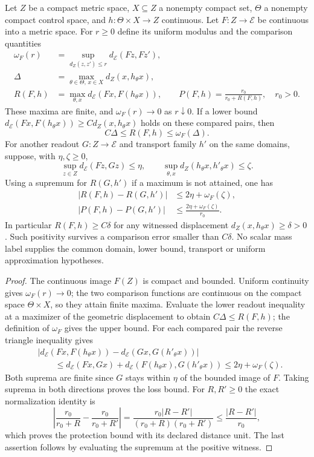 \begin{theorem}\label{thm:readout-loss-stability}
Let $Z$ be a compact metric space, $X\subseteq Z$ a nonempty compact set,
$\Theta$ a nonempty compact control space, and $h:\Theta\times X\to Z$
continuous. Let $F:Z\to\mathcal E$ be continuous into a metric space.
For $r\geq0$ define its uniform modulus and the comparison quantities
\[
\begin{aligned}
 \omega_F(r)&=\sup_{d_Z(z,z')\leq r}d_{\mathcal E}(Fz,Fz'),\\
 \Delta&=\max_{\theta\in\Theta,\,x\in X}d_Z(x,h_\theta x),\\
 R(F,h)&=\max_{\theta,x}d_{\mathcal E}(Fx,F(h_\theta x)),\qquad
 P(F,h)=\frac{r_0}{r_0+R(F,h)},\quad r_0>0.
\end{aligned}
\]
These maxima are finite, and $\omega_F(r)\to0$ as $r\downarrow0$. If a
lower bound $d_{\mathcal E}(Fx,F(h_\theta x))\geq C d_Z(x,h_\theta x)$
holds on these compared pairs, then
\[
 C\Delta\leq R(F,h)\leq\omega_F(\Delta).
\]
For another readout $G:Z\to\mathcal E$ and transport family $h'$ on the same
domains, suppose, with $\eta,\zeta\geq0$,
\[
 \sup_{z\in Z}d_{\mathcal E}(Fz,Gz)\leq\eta,
 \qquad \sup_{\theta,x}d_Z(h_\theta x,h'_\theta x)\leq\zeta.
\]
Using a supremum for $R(G,h')$ if a maximum is not attained, one has
\[
\begin{aligned}
 |R(F,h)-R(G,h')|&\leq2\eta+\omega_F(\zeta),\\
 |P(F,h)-P(G,h')|&\leq\frac{2\eta+\omega_F(\zeta)}{r_0}.
\end{aligned}
\]
In particular $R(F,h)\geq C\delta$ for any witnessed displacement
$d_Z(x,h_\theta x)\geq\delta>0$. Such positivity survives a comparison
error smaller than $C\delta$. No scalar mass label supplies the common
domain, lower bound, transport or uniform approximation hypotheses.
\end{theorem}

\begin{proof}
The continuous image $F(Z)$ is compact and bounded. Uniform continuity gives
$\omega_F(r)\to0$; the two comparison functions are continuous on the compact
space $\Theta\times X$, so they attain finite maxima. Evaluate the lower
readout inequality at a maximizer of the geometric displacement to obtain
$C\Delta\leq R(F,h)$; the definition of $\omega_F$ gives the upper bound.
For each compared pair the reverse triangle inequality gives
\[
\begin{aligned}
 &\bigl|d_{\mathcal E}(Fx,F(h_\theta x))
       -d_{\mathcal E}(Gx,G(h'_\theta x))\bigr|\\
 &\qquad\leq d_{\mathcal E}(Fx,Gx)
        +d_{\mathcal E}(F(h_\theta x),G(h'_\theta x))
 \leq2\eta+\omega_F(\zeta).
\end{aligned}
\]
Both suprema are finite since $G$ stays within $\eta$ of the bounded image
of $F$. Taking suprema in both directions proves the loss bound. For
$R,R'\geq0$ the exact normalization identity is
\[
 \left|\frac{r_0}{r_0+R}-\frac{r_0}{r_0+R'}\right|
 =\frac{r_0|R-R'|}{(r_0+R)(r_0+R')}
 \leq\frac{|R-R'|}{r_0},
\]
which proves the protection bound with its declared distance unit.
The last assertion follows by evaluating the supremum at the positive witness.
\end{proof}
